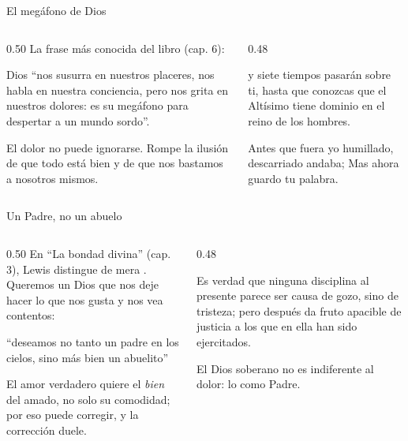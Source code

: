 \begin{frame}{El megáfono de Dios}
\begin{columns}[t,onlytextwidth]
\begin{column}{0.50\textwidth}\small
La frase más conocida del libro (cap. 6):
\begin{tcolorbox}[colback=papiro,colframe=dorado,boxrule=1.2pt,arc=3pt]
\footnotesize Dios ``nos susurra en nuestros placeres, nos habla en nuestra conciencia, pero nos grita en nuestros dolores: es su megáfono para despertar a un mundo sordo''.
\end{tcolorbox}
\scriptsize El dolor no puede ignorarse. Rompe la ilusión de que todo está bien y de que nos bastamos a nosotros mismos.
\end{column}
\begin{column}{0.48\textwidth}
\begin{cita}y siete tiempos pasarán sobre ti, hasta que conozcas que el Altísimo tiene dominio en el reino de los hombres.\end{cita}
\begin{cita}Antes que fuera yo humillado, descarriado andaba; Mas ahora guardo tu palabra.\end{cita}
\end{column}
\end{columns}\par\smallskip
{}
\end{frame}

\begin{frame}{Un Padre, no un abuelo}
\begin{columns}[t,onlytextwidth]
\begin{column}{0.50\textwidth}\small
En ``La bondad divina'' (cap. 3), Lewis distingue  de mera . Queremos un Dios que nos deje hacer lo que nos gusta y nos vea contentos:
\begin{tcolorbox}[colback=papiro,colframe=dorado,boxrule=1.2pt,arc=3pt]
\footnotesize ``deseamos no tanto un padre en los cielos, sino más bien un abuelito''
\end{tcolorbox}
\scriptsize El amor verdadero quiere el \emph{bien} del amado, no solo su comodidad; por eso puede corregir, y la corrección duele.
\end{column}
\begin{column}{0.48\textwidth}
\begin{cita}Es verdad que ninguna disciplina al presente parece ser causa de gozo, sino de tristeza; pero después da fruto apacible de justicia a los que en ella han sido ejercitados.\end{cita}
\small El Dios soberano no es indiferente al dolor: lo  como Padre.
\end{column}
\end{columns}\par\smallskip
{}
\end{frame}

